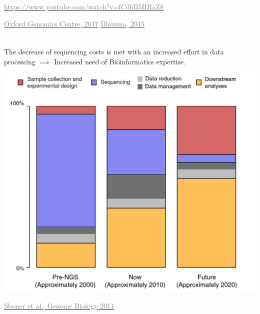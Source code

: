 \documentclass[x11names, svgnames]{beamer}
\begin{document}
\begin{frame}
\begin{columns}[T]
\begin{column}{0.5\textwidth}
\begin{center}
      \end{center}
      \begin{center}
        \tiny{\href{https://www.youtube.com/watch?v=fCd6B5HRaZ8}{\textcolor{gray}{https://www.youtube.com/watch?v=fCd6B5HRaZ8}}}
      \end{center}
      \vspace{4em}
      \footnotesize{
        \hfill\href{https://www.well.ox.ac.uk/ogc/sequencing-quality-monitoring-run/}{\textcolor{gray}{Oxford Genomics Centre, 2017}}
      }
      \vspace{6em}
      \footnotesize{
        \hfill\href{https://emea.illumina.com/content/dam/illumina-marketing/documents/products/other/ivf-reproductive-genetic-health-ngs-primer-1570-2015-012.pdf}{\textcolor{gray}{Illumina, 2015}}
      }
    \end{column}
  \end{columns}
\end{frame}
\begin{frame}
  \frametitle{\four}
  The decrease of sequencing costs is met with an increased effort in data processing $\implies$ Increased need of Bioinformatics expertise.
  \begin{center}
    \includegraphics[scale=0.11]{images/sequencing_cost}
  \end{center}
  \begin{center}
    \vspace{-0.5em}
    \footnotesize{\href{https://doi.org/10.1186/gb-2011-12-8-125}{\textcolor{gray}{Sboner et al., Genome Biology 2011}}}
  \end{center}
\end{frame}
\end{document}
